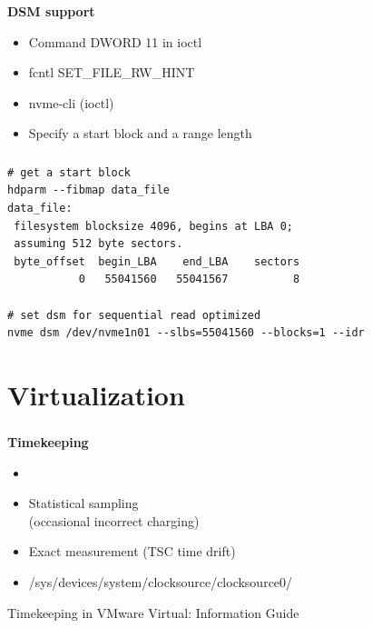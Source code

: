 \documentclass[usenames,dvipsnames, 18pt, compress, aspectratio=169]{beamer}
\begin{document}
\begin{frame}
    \frametitle{}
    \begin{center}
    \textbf{DSM support}

        \begin{itemize}[label={\MVRightarrow}]
            \item Command DWORD 11 in ioctl
            \item fcntl SET\_FILE\_RW\_HINT
            \item nvme-cli (ioctl)
            \item Specify a start block and a range length
        \end{itemize}

    \end{center}
\end{frame}

\begin{frame}[fragile]{}
    \frametitle{}
    \begin{center}

        \begin{verbatim}
# get a start block
hdparm --fibmap data_file
data_file:
 filesystem blocksize 4096, begins at LBA 0;
 assuming 512 byte sectors.
 byte_offset  begin_LBA    end_LBA    sectors
           0   55041560   55041567          8

# set dsm for sequential read optimized
nvme dsm /dev/nvme1n01 --slbs=55041560 --blocks=1 --idr
        \end{verbatim}

    \end{center}
\end{frame}

\fontsize{13pt}{14}\selectfont
\section{Virtualization}
\fontsize{17pt}{18}\selectfont

\begin{frame}
    \frametitle{}
    \begin{center}
    \textbf{Timekeeping}

        \begin{itemize}
            \item <+->
        \end{itemize}

        \begin{itemize}[label={\MVRightarrow}]
            \item <+-> Statistical sampling \\ (occasional incorrect charging)
            \item <+-> Exact measurement (TSC time drift)
            \item <+-> /sys/devices/system/clocksource/clocksource0/
        \end{itemize}

        \normalsize{Timekeeping in VMware Virtual: Information Guide}
    \end{center}
\end{frame}
\end{document}
